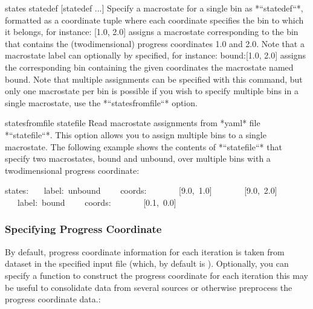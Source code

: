\documentclass[letterpaper,10pt,english]{sphinxmanual}
\begin{document}
\begin{sphinxVerbatim}[commandchars=\\\{\}]
\PYGZhy{}\PYGZhy{}states statedef [statedef ...]
  Specify a macrostate for a single bin as *``statedef``*, formatted
  as a coordinate tuple where each coordinate specifies the bin to
  which it belongs, for instance:
  \PYGZsq{}[1.0, 2.0]\PYGZsq{} assigns a macrostate corresponding to the bin that
  contains the (two\PYGZhy{}dimensional) progress coordinates 1.0 and 2.0.
  Note that a macrostate label can optionally by specified, for
  instance: \PYGZsq{}bound:[1.0, 2.0]\PYGZsq{} assigns the corresponding bin
  containing the given coordinates the macrostate named \PYGZsq{}bound\PYGZsq{}. Note
  that multiple assignments can be specified with this command, but
  only one macrostate per bin is possible \PYGZhy{} if you wish to specify
  multiple bins in a single macrostate, use the
  *``\PYGZhy{}\PYGZhy{}states\PYGZhy{}from\PYGZhy{}file``* option.

\PYGZhy{}\PYGZhy{}states\PYGZhy{}from\PYGZhy{}file statefile
  Read macrostate assignments from *yaml* file *``statefile``*. This
  option allows you to assign multiple bins to a single macrostate.
  The following example shows the contents of *``statefile``* that
  specify two macrostates, bound and unbound, over multiple bins with
  a two\PYGZhy{}dimensional progress coordinate:

\PYGZhy{}\PYGZhy{}\PYGZhy{}
states:
  \PYGZhy{} label: unbound
    coords:
      \PYGZhy{} [9.0, 1.0]
      \PYGZhy{} [9.0, 2.0]
  \PYGZhy{} label: bound
    coords:
      \PYGZhy{} [0.1, 0.0]
\end{sphinxVerbatim}


\subsubsection{Specifying Progress Coordinate}
\label{\detokenize{users_guide/command_line_tools/w_assign:specifying-progress-coordinate}}
By default, progress coordinate information for each iteration is taken from
 dataset in the specified input file (which, by default is ).
Optionally, you can specify a function to construct the progress coordinate for
each iteration \sphinxhyphen{} this may be useful to consolidate data from several sources or
otherwise preprocess the progress coordinate data.:
\end{document}
